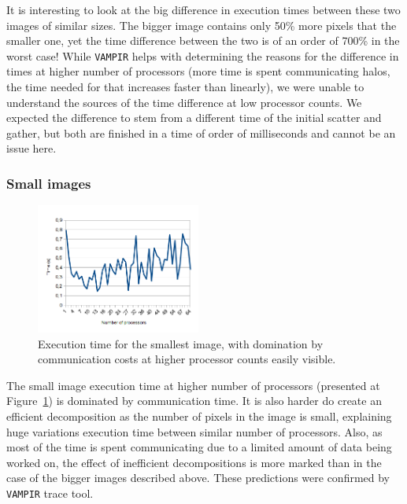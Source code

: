 \documentclass[11pt,a4paper]{article}
\begin{document}
It is interesting to look at the big difference in execution times between these two images of similar sizes.
The bigger image contains only 50\% more pixels that the smaller one, yet the time difference between the two is of an order of 700\% in the worst case!
While \texttt{VAMPIR} helps with determining the reasons for the difference in times at higher number of processors (more time is spent communicating halos, the time needed for that increases faster than linearly), we were unable to understand the sources of the time difference at low processor counts.
We expected the difference to stem from a different time of the initial scatter and gather, but both are finished in a time of order of milliseconds and cannot be an issue here.

\subsubsection{Small images}
\begin{figure}
    \vspace{-40pt}
    \begin{center}
        \includegraphics[width=0.48\textwidth]{small_time.png}
    \end{center}
    \vspace{-20pt}
    \caption{Execution time for the smallest image, with domination by communication costs at higher processor counts easily visible.}\label{fig:small}
    \vspace{-10pt}
\end{figure}

The small image execution time at higher number of processors (presented at Figure~\ref{fig:small}) is dominated by communication time.
It is also harder do create an efficient decomposition as the number of pixels in the image is small, explaining huge variations execution time between similar number of processors.
Also, as most of the time is spent communicating due to a limited amount of data being worked on, the effect of inefficient decompositions is more marked than in the case of the bigger images described above.
These predictions were confirmed by \texttt{VAMPIR} trace tool.
\end{document}
